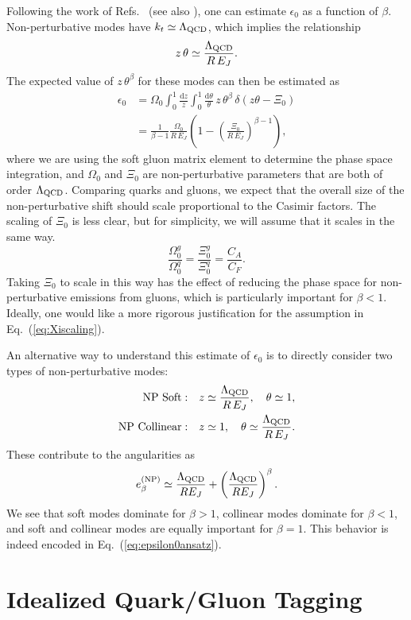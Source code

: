 \documentclass[11pt,letterpaper]{article}
\newcommand{\df}{\text{d}}
\DeclareRobustCommand{\Eq}[1]{Eq.~(\ref{#1})}
\DeclareRobustCommand{\Refs}[1]{Refs.~\cite{#1}}
\newcommand{\be}{\begin{equation}}
\newcommand{\ee}{\end{equation}}
\begin{document}
Following the work of \Refs{} (see also \cite{}), one can estimate $\epsilon_0$ as a function of $\beta$.  Non-perturbative modes have $k_t \simeq \Lambda_{\rm QCD}$, which implies the relationship
\be
z \, \theta \simeq \frac{\Lambda_{\rm QCD}}{R \, E_J}.
\ee
The expected value of $z \, \theta^\beta$ for these modes can then be estimated as
\begin{align}
\epsilon_0 &= \Omega_0 \int_0^1 \frac{\df z}{z} \int_0^1 \frac{ \df \theta}{ \theta} \, z \, \theta^\beta \, \delta(z \theta - \Xi_0) \nonumber \\
&= \frac{1}{\beta - 1} \frac{\Omega_0}{R \, E_J} \left( 1 - \left(\frac{\Xi_0}{R \, E_J} \right)^{\beta -1} \right),  \label{eq:epsilon0ansatz}
\end{align}
where we are using the soft gluon matrix element to determine the phase space integration, and $\Omega_0$ and $\Xi_0$ are non-perturbative parameters that are both of order $\Lambda_{\rm QCD}$.  Comparing quarks and gluons, we expect that the overall size of the non-perturbative shift should scale proportional to the Casimir factors.  The scaling of $\Xi_0$ is less clear, but for simplicity, we will assume that it scales in the same way.
\be
\label{eq:Xiscaling}
\frac{\Omega_0^g}{\Omega_0^q} = \frac{\Xi_0^g}{\Xi_0^q} = \frac{C_A}{C_F}.
\ee
Taking $\Xi_0$ to scale in this way has the effect of reducing the phase space for non-perturbative emissions from gluons, which is particularly important for $\beta < 1$.  Ideally, one would like a more rigorous justification for the assumption in \Eq{eq:Xiscaling}. 

An alternative way to understand this estimate of $\epsilon_0$ is to directly consider two types of non-perturbative modes:
\begin{align}
\text{NP Soft}: & \quad z \simeq \frac{\Lambda_{\rm QCD}}{R \, E_J}, \quad \theta \simeq 1, \\
\text{NP Collinear}: & \quad z \simeq 1, \quad \theta \simeq \frac{\Lambda_{\rm QCD}}{R \, E_J}.
\end{align}
These contribute to the angularities as
\be
e_\beta^{\text{(NP)}} \simeq \frac{\Lambda_{\rm QCD}}{R E_J} + \left( \frac{\Lambda_{\rm QCD}}{R E_J} \right)^\beta.
\ee
We see that soft modes dominate for $\beta > 1$, collinear modes dominate for $\beta < 1$, and soft and collinear modes are equally important for $\beta = 1$.  This behavior is indeed encoded in \Eq{eq:epsilon0ansatz}.

\section{Idealized Quark/Gluon Tagging}
\label{sec:ee}
\end{document}
